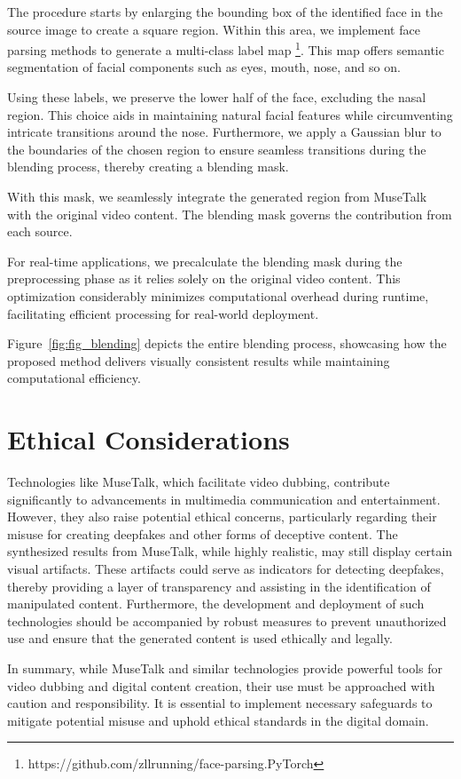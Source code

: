 \documentclass[10pt,twocolumn,letterpaper]{article}
\begin{document}
The procedure starts by enlarging the bounding box of the identified face in the source image to create a square region. Within this area, we implement face parsing methods to generate a multi-class label map \footnote{https://github.com/zllrunning/face-parsing.PyTorch}. This map offers semantic segmentation of facial components such as eyes, mouth, nose, and so on.

Using these labels, we preserve the lower half of the face, excluding the nasal region. This choice aids in maintaining natural facial features while circumventing intricate transitions around the nose. Furthermore, we apply a Gaussian blur to the boundaries of the chosen region to ensure seamless transitions during the blending process, thereby creating a blending mask.

With this mask, we seamlessly integrate the generated region from MuseTalk with the original video content. The blending mask governs the contribution from each source.

For real-time applications, we precalculate the blending mask during the preprocessing phase as it relies solely on the original video content. This optimization considerably minimizes computational overhead during runtime, facilitating efficient processing for real-world deployment.

Figure~\ref{fig:fig_blending} depicts the entire blending process, showcasing how the proposed method delivers visually consistent results while maintaining computational efficiency.


\section{Ethical Considerations}
Technologies like MuseTalk, which facilitate video dubbing, contribute significantly to advancements in multimedia communication and entertainment. However, they also raise potential ethical concerns, particularly regarding their misuse for creating deepfakes and other forms of deceptive content. The synthesized results from MuseTalk, while highly realistic, may still display certain visual artifacts. These artifacts could serve as indicators for detecting deepfakes, thereby providing a layer of transparency and assisting in the identification of manipulated content. Furthermore, the development and deployment of such technologies should be accompanied by robust measures to prevent unauthorized use and ensure that the generated content is used ethically and legally.

In summary, while MuseTalk and similar technologies provide powerful tools for video dubbing and digital content creation, their use must be approached with caution and responsibility. It is essential to implement necessary safeguards to mitigate potential misuse and uphold ethical standards in the digital domain.
\end{document}
